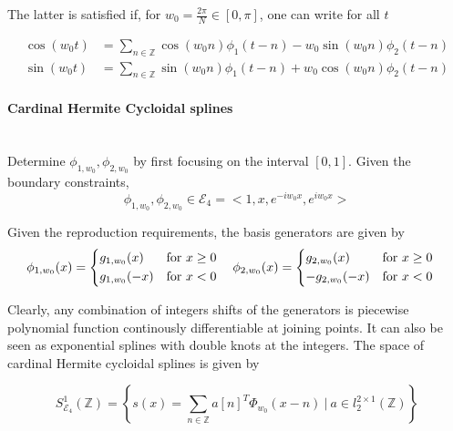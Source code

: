 \documentclass[a4paper, 11pt]{article}
\begin{document}
The latter is satisfied if, for $w_0 = \frac{2\pi}{N} \in [0, \pi]$, one can write for all $t$

\begin{align}
  \cos (w_0t) &= \sum_{n \in \mathbb{Z}} \cos (w_0n) \phi_1(t-n) - w_0 \sin (w_0n) \phi_2(t-n) \\
  \sin (w_0t) &= \sum_{n \in \mathbb{Z}} \sin (w_0n) \phi_1(t-n) + w_0 \cos (w_0n) \phi_2(t-n)
\end{align}

\paragraph{Cardinal Hermite Cycloidal splines} \mbox{} \\

Determine $\phi_{1, w_0}, \phi_{2, w_0}$ by first focusing on the interval $[0, 1]$. Given the boundary constraints, 
\begin{equation}
  \phi_{1,w_0}, \phi_{2, w_0} \in \mathcal{E}_4 = <1, x, e^{-iw_0x}, e^{iw_0x}>
\end{equation}

Given the reproduction requirements, the basis generators are given by
\begin{equation}
  \phi_{1, w_0}(x) =
  \begin{dcases}
    g_{1, w_0}(x) &\text{for } x \geq 0 \\
    g_{1, w_0}(-x) &\text{for } x < 0\\
  \end{dcases} \quad
  \hfill
  \phi_{2, w_0}(x) =
  \begin{dcases}
    g_{2, w_0}(x) &\text{for } x \geq 0 \\
    -g_{2, w_0}(-x) &\text{for } x < 0\\
  \end{dcases} \quad
\end{equation}

Clearly, any combination of integers shifts of the generators is piecewise polynomial function continously 
differentiable at joining points. It can also be seen as exponential splines with double knots at the integers. The 
space of cardinal Hermite cycloidal splines is given by

\begin{equation}
  S^1_{\mathcal{E}_4}(\mathbb{Z}) = \left\{ s(x) = \sum_{n \in \mathbb{Z}} {a[n]}^T \Phi_{w_0}(x-n) \ | \ a \in 
  l^{2\times1}_2(\mathbb{Z}) \right\}
\end{equation}
\end{document}
